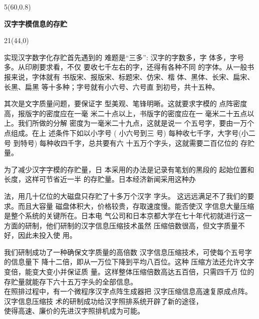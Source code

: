 \documentclass[linespread=1]{ctexart}
\begin{document}
\begin{textblock*}{5\ccwd}(60\ccwd,0.8\ccwd)
\begin{center}
\begin{minipage}{2\ccwd}
\LARGE%
\begin{spacing}{1.43}
\textbf{汉字字模信息的存贮}
\end{spacing}
\end{minipage}
\end{center}
\end{textblock*}
\begin{textblock*}{21\ccwd}(44\ccwd,0\ccwd)
\begin{minipage}[t]{16\ccwd}
\setlength{\parindent}{2\ccwd}
实现汉字数字化存贮首先遇到的
难题是“三多”: 汉字的字数多，字\linebreak
体多，字号多。从印刷要求看，不仅
要收七千左右的字，还得有各种不同
的字体。从一般书报来说，字体就有
书版宋、报版宋、标题宋、仿宋、楷
体、黑体、长宋、扁宋、长黑、扁黑
等十多种；字号就有小六号、六号直
到初号，共十五种。

其次是文字质量问题，要保证字
型美观、笔锋明晰。这就要求字模的\linebreak
点阵密度高，报版字的密度应在一毫
米二十点以上，书版字的密度应在一
毫米二十五点以上。我们所做的分解
密度为一毫米二十九点，这就是说一
个五号字，要由一万个点组成。在上\linebreak
述条件下如以小字号 ( 小六号到三
号) 每种收七千字，大字号(小二号\linebreak
到特号) 每种收四千字，总共要有六
十五万个字头，这就需要二百亿位的
存贮量。

为了减少汉字字模的存贮量，日
本采用的办法是记录有笔划的黑段的
起始位置和长度，这样可节省近一半
的存贮量。日本经济新闻采用这种办
\end{minipage}

\vspace{1.5pt}
法，用几十亿位的大磁盘只存贮了十多万个汉字
字头。 这远远满足不了我们的要求。而且大容量
 磁盘体积大，价格较贵，存取速度慢。能否使汉
字信息大量压缩是整个系统的关键所在。日本电
气公司和日本京都大学在七十年代初就进行这一
方面的研制，他们研制的汉字信息压缩技术虽然
压缩倍数很高，但文字质量不好，因此未投入使
用。　　

\hspace{2\ccwd}%
我们研制成功了一种确保文字质量的高倍数
汉字信息压缩技术，可使每个五号字的信息量下
降十二倍，即从一万位下降到平均八百位。这种
压缩方法还允许文字变倍，能变大变小并保证质
量。这样整体压缩倍数高达五百倍，只需四千万\linebreak
位的存贮量就能存下六十五万字头的全部信息。\\
在照排过程中，有一个微程序汉字点阵生成器把
汉字压缩信息高速复原成点阵。汉字信息压缩技
术的研制成功给汉字照排系统开辟了新的途径，\\
使得高速、廉价的先进汉字照排机成为可能。\\
%
 
\end{textblock*}
\end{document}
